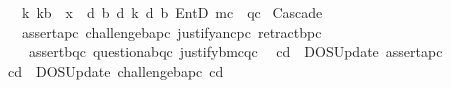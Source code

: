 \begin{isabellebody}
\ \ {\isasymor}\ {\isacharparenleft}{\kern0pt}{\isasymexists}k{\isachardot}{\kern0pt}\ k{\isasymnoteq}b\ {\isasymand}\ x\ {\isacharequal}{\kern0pt}\ {\isasymD}\isactrlsup d\ b\ {\isacharparenleft}{\kern0pt}{\isasymB}\isactrlsup d\ k\ {\isacharparenleft}{\kern0pt}{\isasymB}\isactrlsup d\ b\ {\isacharparenleft}{\kern0pt}EntD\ {\isacharparenleft}{\kern0pt}m\isactrlsup c{\isacharparenright}{\kern0pt}\ {\isasymoplus}\ {\isacharparenleft}{\kern0pt}q\isactrlsup c{\isacharparenright}{\kern0pt}{\isacharparenright}{\kern0pt}{\isacharparenright}{\kern0pt}{\isacharparenright}{\kern0pt}{\isacharparenright}{\kern0pt}{\isachardoublequoteclose}\isanewline
\isanewline
{}\isamarkupfalse%
\ {\isachardoublequoteopen}Cascade\ {\isasymequiv}\isanewline
\ \ {\isacharbrackleft}{\kern0pt}\ assert{\isacharbrackleft}{\kern0pt}a{\isacharcomma}{\kern0pt}p\isactrlsup c{\isacharbrackright}{\kern0pt}{\isacharcomma}{\kern0pt}\ challenge{\isacharbrackleft}{\kern0pt}b{\isacharcomma}{\kern0pt}a{\isacharcomma}{\kern0pt}p\isactrlsup c{\isacharbrackright}{\kern0pt}{\isacharcomma}{\kern0pt}\ justify{\isacharbrackleft}{\kern0pt}a{\isacharcomma}{\kern0pt}n\isactrlsup c{\isasymturnstile}\isactrlsup {\isasymoplus}p\isactrlsup c{\isacharbrackright}{\kern0pt}{\isacharcomma}{\kern0pt}\ retract{\isacharbrackleft}{\kern0pt}b{\isacharcomma}{\kern0pt}p\isactrlsup c{\isacharcomma}{\kern0pt}{\isasymominus}{\isacharbrackright}{\kern0pt}{\isacharcomma}{\kern0pt}\isanewline
\ \ \ \ assert{\isacharbrackleft}{\kern0pt}b{\isacharcomma}{\kern0pt}q\isactrlsup c{\isacharbrackright}{\kern0pt}{\isacharcomma}{\kern0pt}\ question{\isacharbrackleft}{\kern0pt}a{\isacharcomma}{\kern0pt}b{\isacharcomma}{\kern0pt}q\isactrlsup c{\isacharbrackright}{\kern0pt}{\isacharcomma}{\kern0pt}\ justify{\isacharbrackleft}{\kern0pt}b{\isacharcomma}{\kern0pt}m\isactrlsup c{\isasymturnstile}\isactrlsup {\isasymoplus}q\isactrlsup c{\isacharbrackright}{\kern0pt}\ {\isacharbrackright}{\kern0pt}{\isachardoublequoteclose}\isanewline
\isanewline
{}\isamarkupfalse%
\ {\isachardoublequoteopen}cd\ {\isasymequiv}\ DOSUpdate\ assert{\isacharbrackleft}{\kern0pt}a{\isacharcomma}{\kern0pt}p\isactrlsup c{\isacharbrackright}{\kern0pt}\ {\isacharbrackleft}{\kern0pt}{\isacharbrackright}{\kern0pt}{\isachardoublequoteclose}\isanewline
{}\isamarkupfalse%
\ {\isachardoublequoteopen}cd\ {\isasymequiv}\ DOSUpdate\ challenge{\isacharbrackleft}{\kern0pt}b{\isacharcomma}{\kern0pt}a{\isacharcomma}{\kern0pt}p\isactrlsup c{\isacharbrackright}{\kern0pt}\ cd\isanewline

\end{isabellebody}

